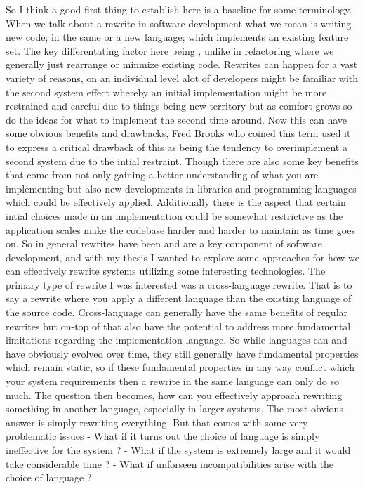 \markdownRendererDocumentBegin
{}\markdownRendererInterblockSeparator
{}So I think a good first thing to establish here is a baseline for some terminology. When we talk about a rewrite in software development what we mean is writing new code; in the same or a new language; which implements an existing feature set. The key differentating factor here being , unlike in refactoring where we generally just rearrange or minmize existing code. Rewrites can happen for a vast variety of reasons, on an individual level alot of developers might be familiar with the second system effect whereby an initial implementation might be more restrained and careful due to things being new territory but as comfort grows so do the ideas for what to implement the second time around. Now this can have some obvious benefits and drawbacks, Fred Brooks who coined this term used it to express a critical drawback of this as being the tendency to overimplement a second system due to the intial restraint. Though there are also some key benefits that come from not only gaining a better understanding of what you are implementing but also new developments in libraries and programming languages which could be effectively applied. Additionally there is the aspect that certain intial choices made in an implementation could be somewhat restrictive as the application scales make the codebase harder and harder to maintain as time goes on. So in general rewrites have been and are a key component of software development, and with my thesis I wanted to explore some approaches for how we can effectively rewrite systems utilizing some interesting technologies.\markdownRendererInterblockSeparator
{}\markdownRendererInterblockSeparator
{}The primary type of rewrite I was interested was a cross-language rewrite. That is to say a rewrite where you apply a different language than the existing language of the source code. Cross-language can generally have the same benefits of regular rewrites but on-top of that also have the potential to address more fundamental limitations regarding the implementation language. \markdownRendererInterblockSeparator
{}So while languages can and have obviously evolved over time, they still generally have fundamental properties which remain static, so if these fundamental properties in any way conflict which your system requirements then a rewrite in the same language can only do so much.\markdownRendererInterblockSeparator
{}The question then becomes, how can you effectively approach rewriting something in another language, especially in larger systems. The most obvious answer is simply rewriting everything. But that comes with some very problematic issues - What if it turns out the choice of language is simply ineffective for the system ? - What if the system is extremely large and it would take considerable time ? - What if unforseen incompatibilities arise with the choice of language ? \markdownRendererInterblockSeparator

